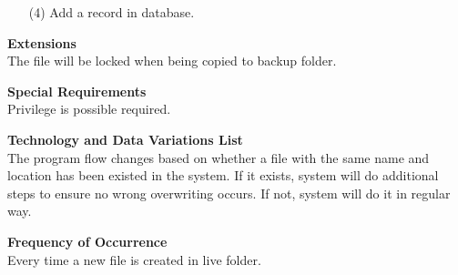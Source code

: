 \documentclass[12pt,a4paper]{article}
\begin{document}
\begin{description}
\begin{itemize}
		\item[(4)] Add a record in database.
	\end{itemize}
	\item \textbf{Extensions} \\
		The file will be locked when being copied to backup folder.
	\item \textbf{Special Requirements}\\
		Privilege is possible required.
	\item \textbf{Technology and Data Variations List}\\
		The program flow changes based on whether a file with the same name and location has been existed in the system. If it exists, system will do additional steps to ensure no wrong overwriting occurs. If not, system will do it in regular way.
	\item \textbf{Frequency of Occurrence}\\
		Every time a new file is created in live folder.
\end{description}
\end{document}
